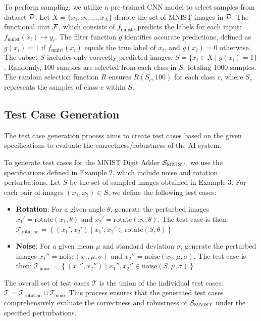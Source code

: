 \documentclass[10pt, conference, a4paper, final]{IEEEtran}
\begin{document}
\begin{example}
    To perform sampling, we utilize a pre-trained CNN model to select samples from dataset $\D$. Let $X = \{x_1, x_2, \dots, x_N\}$ denote the set of MNIST images in $\D$. The functional unit $\F$, which consists of $f_{\text{mnist}}$, predicts the labels for each input: $f_{\text{mnist}}(x_i) \rightarrow y_i$. The filter function $g$ identifies accurate predictions, defined as $g(x_i) = 1$ if $f_{\text{mnist}}(x_i)$ equals the true label of $x_i$, and $g(x_i) = 0$ otherwise. The subset $S$ includes only correctly predicted images: $S = \{x_i \in X \mid g(x_i) = 1\}$. Randomly, 100 samples are selected from each class in $S$, totaling 1000 samples. The random selection function $R$ ensures $R(S_c, 100)$ for each class $c$, where $S_c$ represents the samples of class $c$ within $S$.
  \end{example} 


  \subsection{Test Case Generation}
  The test case generation process aims to create test cases based on the given specifications to evaluate the correctness/robustness of the AI system.
  \begin{example}
    To generate test cases for the MNIST Digit Adder $\S_{\text{MNIST}}$, we use the specifications defined in Example 2, which include noise and rotation perturbations. Let $S$ be the set of sampled images obtained in Example 3. For each pair of images $(x_1, x_2) \in S$, we define the following test cases:
    \begin{itemize}
        \item \textbf{Rotation}: For a given angle $\theta$, generate the perturbed images $x_1' = \text{rotate}(x_1, \theta)$ and $x_2' = \text{rotate}(x_2, \theta)$. The test case is then:
        $\mathcal{T}_{\text{rotation}} = \left\{(x_1', x_2') \mid x_1', x_2' \in \text{rotate}(S, \theta)\right\}$
        \item \textbf{Noise}: For a given mean $\mu$ and standard deviation $\sigma$, generate the perturbed images $x_1'' = \text{noise}(x_1, \mu, \sigma)$ and $x_2'' = \text{noise}(x_2, \mu, \sigma)$. The test case is then:
        $\mathcal{T}_{\text{noise}} = \left\{(x_1'', x_2'') \mid x_1'', x_2'' \in \text{noise}(S, \mu, \sigma)\right\}$
    \end{itemize}
    The overall set of test cases $\mathcal{T}$ is the union of the individual test cases:
    $\mathcal{T} = \mathcal{T}_{\text{rotation}} \cup \mathcal{T}_{\text{noise}}$
    This process ensures that the generated test cases comprehensively evaluate the correctness and robustness of $\S_{\text{MNIST}}$ under the specified perturbations.
\end{example}
\end{document}
